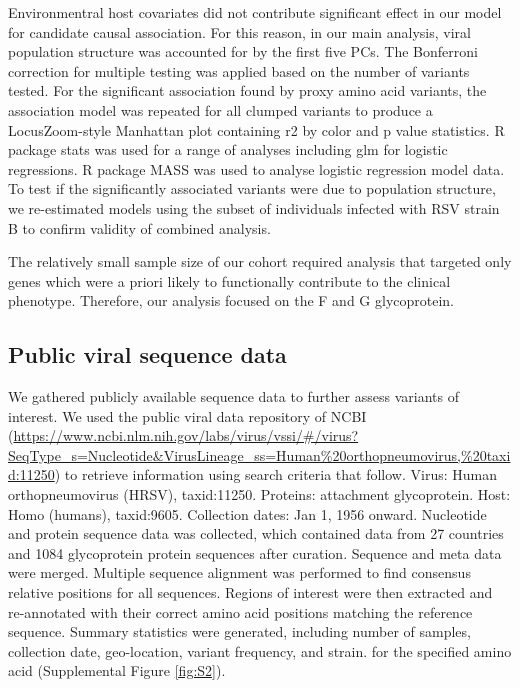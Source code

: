 \documentclass{article} %
\begin{document}
Environmentral host covariates did not contribute significant effect in our model for candidate causal association. 
For this reason, in our main analysis, viral population structure was accounted for by the first five PCs. 
The Bonferroni correction for multiple testing was applied based on the number of variants tested. For the significant association found by proxy amino acid variants, the association model was repeated for all clumped variants to produce a LocusZoom-style Manhattan plot containing r2 by color and p value statistics. 
R package stats was used for a range of analyses including glm for logistic regressions. 
R package MASS was used to analyse logistic regression model data. 
To test if the significantly associated variants were due to population structure, we re-estimated models using the subset of individuals infected with RSV strain B to confirm validity of combined analysis.

The relatively small sample size of our cohort required analysis that targeted only genes which were a priori likely to functionally contribute to the clinical phenotype. 
Therefore, our analysis focused on the F and G glycoprotein.

\subsection{Public viral sequence data}
We gathered publicly available sequence data to further assess variants of interest. We used the public viral data repository of NCBI 
(\url{https://www.ncbi.nlm.nih.gov/labs/virus/vssi/#/virus?SeqType_s=Nucleotide&VirusLineage_ss=Human\%20orthopneumovirus,\%20taxid:11250})
to retrieve information using search criteria that follow. Virus: Human orthopneumovirus (HRSV), taxid:11250. 
Proteins: attachment glycoprotein. Host: Homo (humans), taxid:9605. 
Collection dates: Jan 1, 1956 onward. 
Nucleotide and protein sequence data was collected, which contained data from 27 countries and 1084 glycoprotein protein sequences after curation. 
Sequence and meta data were merged. 
Multiple sequence alignment was performed to find consensus relative positions for all sequences. 
Regions of interest were then extracted and re-annotated with their correct amino acid positions matching the reference sequence. Summary statistics were generated, including number of samples, collection date, geo-location, variant frequency, and strain. for the specified amino acid 
(Supplemental Figure \ref{fig:S2}).
\end{document}
